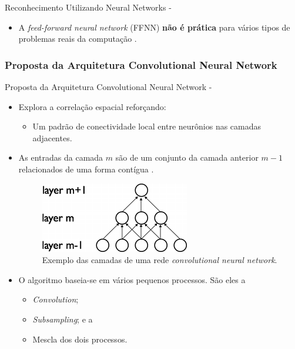 \documentclass[aspectratio=169, xcolor=dvipsnames]{beamer}
\let\olditem=\item%
\renewcommand{\item}{\olditem \justifying}
\begin{document}
\begin{frame}[allowframebreaks]{Reconhecimento Utilizando Neural Networks -}
\begin{itemize}
\begin{itemize}
				\end{itemize}

				\item A \textit{feed-forward neural network} (FFNN) \textbf{não é prática} para vários tipos de problemas reais da computação \cite{Glorot2010}.

			\end{itemize}
		\end{frame}

		\subsubsection{Proposta da Arquitetura Convolutional Neural Network}
		\begin{frame}[allowframebreaks]{Proposta da Arquitetura Convolutional Neural Network -}
			\begin{itemize}
				\setlength\itemsep{2em}
				\item Explora a correlação espacial reforçando:
				\begin{itemize}
					\setlength\itemsep{1em}
					\item Um padrão de conectividade local entre neurônios nas camadas adjacentes.
				\end{itemize}

				\item As entradas da camada $ m $ são de um conjunto da camada anterior $ m-1 $ relacionados de uma forma contígua \cite{LeCun1998}.

					\begin{figure}[H]
						\centering
						\includegraphics[width=0.45\linewidth]{img/layers_cnn.png}
						\caption{Exemplo das camadas de uma rede \textit{convolutional neural network}.}
						\label{fig:layers_cnn}
					\end{figure}

				\item O algoritmo baseia-se em vários pequenos processos. São eles a
				\begin{itemize}
					\item \textit{Convolution};
					\item \textit{Subsampling}; e a
					\item Mescla dos dois processos.
				\end{itemize}


\end{itemize}
\end{frame}
\end{document}
